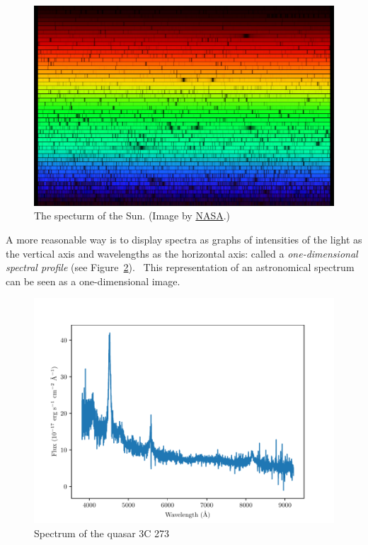 \begin{figure}
\includegraphics[width=\textwidth]{img/solarspectrum.jpg}
\caption[The Solar spectrum]{
	The specturm of the Sun. (Image by \href{https://solarsystem.nasa.gov/resources/390/the-solar-spectrum/}{NASA}.)
}
\label{solar_spectrum}
\end{figure}

A more reasonable way is to display spectra as graphs of intensities of the light as the vertical axis and wavelengths as the horizontal axis:
called a \textit{one-dimensional spectral profile}
(see Figure~\ref{3c_273_spectrum}).~\cite{cochard2018}
This representation of an astronomical spectrum can be seen as a one-dimensional image.~\cite{bennett2005}

\begin{figure}
\includegraphics[width=\textwidth]{img/spec_3c_273.pdf}
\caption{Spectrum of the quasar 3C 273}
\label{3c_273_spectrum}
\end{figure}



